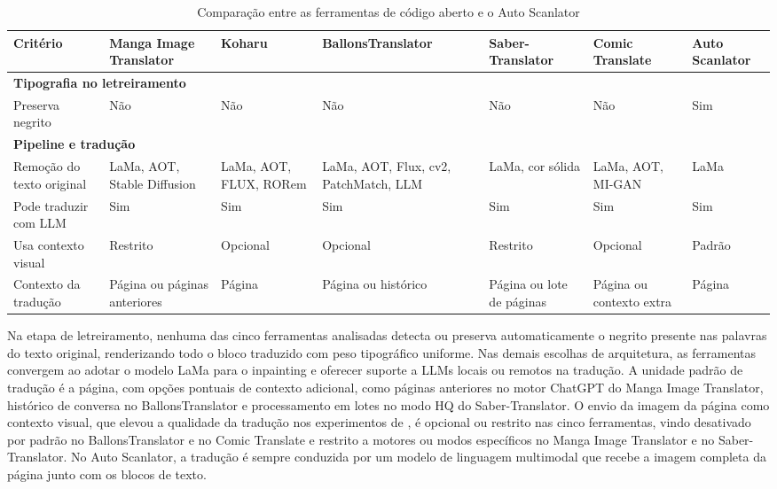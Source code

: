 \documentclass[
    12pt,
    openright,
    oneside,
    a4paper,
    chapter=TITLE,
    section=TITLE,
    english,
    brazilian,
    brazil
]{abntex2}
\renewcommand{\footnotesize}{\fontsize{10pt}{12pt}\selectfont}
\begin{document}
\begin{table}[htb]
    \caption{Comparação entre as ferramentas de código aberto e o Auto Scanlator}
    \label{tab:comparacao-ferramentas}
    \centering
    \footnotesize
    \setlength{\tabcolsep}{3pt}
    \renewcommand{\arraystretch}{1.25}
    \begin{tabular}{|p{2.9cm}|p{1.9cm}|p{1.9cm}|p{1.9cm}|p{1.9cm}|p{1.9cm}|p{1.9cm}|}
        \hline
        \textbf{Critério} & \textbf{Manga Image Translator} & \textbf{Koharu} & \textbf{Ballons\hspace{0pt}Translator} & \textbf{Saber-Translator} & \textbf{Comic Translate} & \textbf{Auto Scanlator} \\
        \hline
        \hline
        \multicolumn{7}{|l|}{\textbf{Tipografia no letreiramento}} \\
        \hline
        Preserva negrito & Não & Não & Não & Não & Não & Sim \\
        \hline
        \hline
        \multicolumn{7}{|l|}{\textbf{Pipeline e tradução}} \\
        \hline
        Remoção do texto original & LaMa, AOT, Stable Diffusion & LaMa, AOT, FLUX, RORem & LaMa, AOT, Flux, cv2, PatchMatch, LLM & LaMa, cor sólida & LaMa, AOT, MI-GAN & LaMa \\
        \hline
        Pode traduzir com LLM & Sim & Sim & Sim & Sim & Sim & Sim \\
        \hline
        Usa contexto visual & Restrito & Opcional & Opcional & Restrito & Opcional & Padrão \\
        \hline
        Contexto da tradução & Página ou páginas anteriores & Página & Página ou histórico & Página ou lote de páginas & Página ou contexto extra & Página \\
        \hline
    \end{tabular}
\end{table}

Na etapa de letreiramento, nenhuma das cinco ferramentas analisadas detecta ou preserva automaticamente o negrito presente nas palavras do texto original, renderizando todo o bloco traduzido com peso tipográfico uniforme. Nas demais escolhas de arquitetura, as ferramentas convergem ao adotar o modelo LaMa para o inpainting e oferecer suporte a LLMs locais ou remotos na tradução. A unidade padrão de tradução é a página, com opções pontuais de contexto adicional, como páginas anteriores no motor ChatGPT do Manga Image Translator, histórico de conversa no BallonsTranslator e processamento em lotes no modo HQ do Saber-Translator. O envio da imagem da página como contexto visual, que elevou a qualidade da tradução nos experimentos de , é opcional ou restrito nas cinco ferramentas, vindo desativado por padrão no BallonsTranslator e no Comic Translate e restrito a motores ou modos específicos no Manga Image Translator e no Saber-Translator. No Auto Scanlator, a tradução é sempre conduzida por um modelo de linguagem multimodal que recebe a imagem completa da página junto com os blocos de texto.
\end{document}
